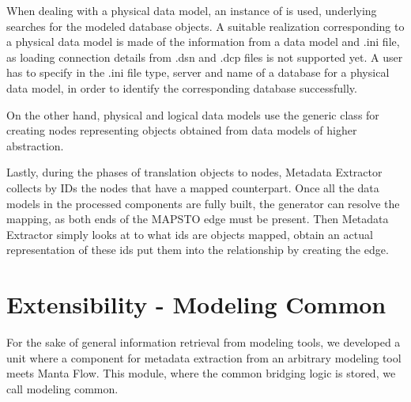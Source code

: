 When dealing with a physical data model, an instance of  is used, underlying  searches for the modeled database objects. 
A suitable  realization corresponding to a physical data model is made of the information from a data model and .ini file, as loading connection details from .dsn and .dcp files is not supported yet. A user has to specify in the .ini file type, server and name of a database for a physical data model, in order to identify the corresponding database successfully.

On the other hand, physical and logical data models use the generic  class for creating nodes representing objects obtained from data models of higher abstraction.

Lastly, during the phases of translation objects to nodes, Metadata Extractor collects by IDs the nodes that have a mapped counterpart.
Once all the data models in the processed components are fully built, the generator can resolve the mapping, as both ends of the MAPS\textunderscore TO edge must be present. 
Then Metadata Extractor simply looks at to what ids are objects mapped, obtain an actual representation of these ids put them into the relationship by creating the edge.

\section{Extensibility - Modeling Common}
\label{modeling_common}

For the sake of general information retrieval from modeling tools, we developed a unit where a component for metadata extraction from an arbitrary modeling tool meets Manta Flow.
This module, where the common bridging logic is stored, we call modeling common.

